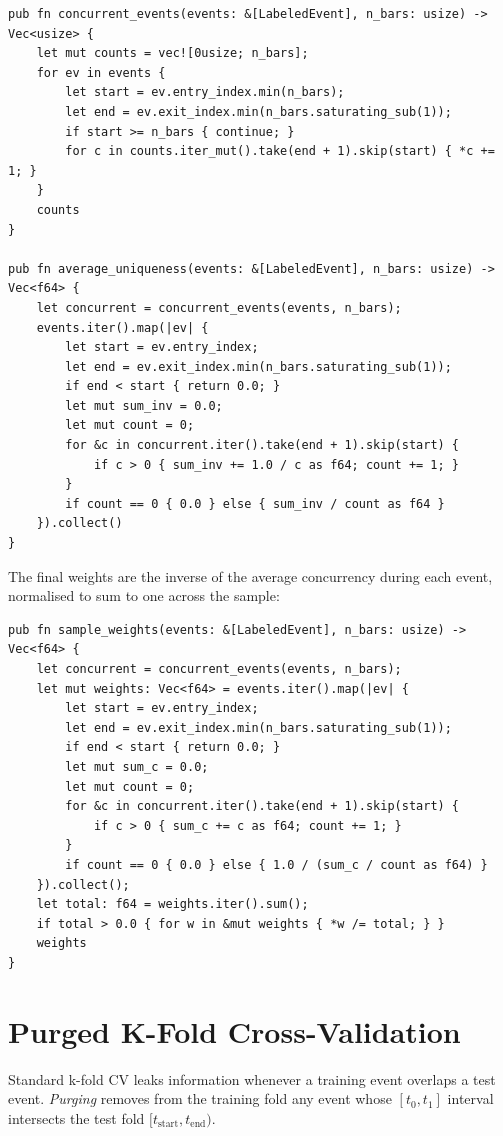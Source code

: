 \begin{lstlisting}[caption={Concurrency counts and average uniqueness}]
pub fn concurrent_events(events: &[LabeledEvent], n_bars: usize) -> Vec<usize> {
    let mut counts = vec![0usize; n_bars];
    for ev in events {
        let start = ev.entry_index.min(n_bars);
        let end = ev.exit_index.min(n_bars.saturating_sub(1));
        if start >= n_bars { continue; }
        for c in counts.iter_mut().take(end + 1).skip(start) { *c += 1; }
    }
    counts
}

pub fn average_uniqueness(events: &[LabeledEvent], n_bars: usize) -> Vec<f64> {
    let concurrent = concurrent_events(events, n_bars);
    events.iter().map(|ev| {
        let start = ev.entry_index;
        let end = ev.exit_index.min(n_bars.saturating_sub(1));
        if end < start { return 0.0; }
        let mut sum_inv = 0.0;
        let mut count = 0;
        for &c in concurrent.iter().take(end + 1).skip(start) {
            if c > 0 { sum_inv += 1.0 / c as f64; count += 1; }
        }
        if count == 0 { 0.0 } else { sum_inv / count as f64 }
    }).collect()
}
\end{lstlisting}

The final weights are the inverse of the average concurrency during
each event, normalised to sum to one across the sample:

\begin{lstlisting}[caption={Sample weights from inverse concurrency}]
pub fn sample_weights(events: &[LabeledEvent], n_bars: usize) -> Vec<f64> {
    let concurrent = concurrent_events(events, n_bars);
    let mut weights: Vec<f64> = events.iter().map(|ev| {
        let start = ev.entry_index;
        let end = ev.exit_index.min(n_bars.saturating_sub(1));
        if end < start { return 0.0; }
        let mut sum_c = 0.0;
        let mut count = 0;
        for &c in concurrent.iter().take(end + 1).skip(start) {
            if c > 0 { sum_c += c as f64; count += 1; }
        }
        if count == 0 { 0.0 } else { 1.0 / (sum_c / count as f64) }
    }).collect();
    let total: f64 = weights.iter().sum();
    if total > 0.0 { for w in &mut weights { *w /= total; } }
    weights
}
\end{lstlisting}

\section{Purged K-Fold Cross-Validation}

Standard k-fold CV leaks information whenever a training event
overlaps a test event. \emph{Purging} removes from the training
fold any event whose $[t_0, t_1]$ interval intersects the test fold
$[t_{\text{start}}, t_{\text{end}})$.

